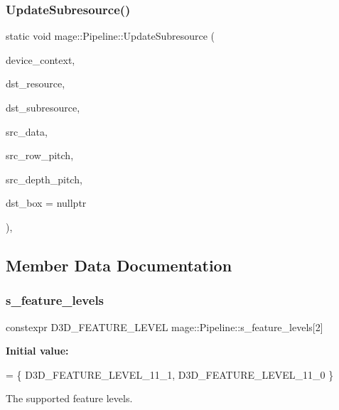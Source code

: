 \subsubsection{\texorpdfstring{Update\+Subresource()}{UpdateSubresource()}}
{\footnotesize\ttfamily static void mage\+::\+Pipeline\+::\+Update\+Subresource (\begin{DoxyParamCaption}\item[{I\+D3\+D11\+Device\+Context4 $\ast$}]{device\+\_\+context,  }\item[{I\+D3\+D11\+Resource $\ast$}]{dst\+\_\+resource,  }\item[{\hyperlink{namespacemage_a41c104c036fba3756a74e19f793eeaa1}{U32}}]{dst\+\_\+subresource,  }\item[{const void $\ast$}]{src\+\_\+data,  }\item[{\hyperlink{namespacemage_a41c104c036fba3756a74e19f793eeaa1}{U32}}]{src\+\_\+row\+\_\+pitch,  }\item[{\hyperlink{namespacemage_a41c104c036fba3756a74e19f793eeaa1}{U32}}]{src\+\_\+depth\+\_\+pitch,  }\item[{const D3\+D11\+\_\+\+B\+OX $\ast$}]{dst\+\_\+box = {\ttfamily nullptr} }\end{DoxyParamCaption})\hspace{0.3cm}{\ttfamily [static]}, {\ttfamily [noexcept]}}



\subsection{Member Data Documentation}
\hypertarget{structmage_1_1_pipeline_aa451423df031e728f3a3a35bfc942a9b}{}\label{structmage_1_1_pipeline_aa451423df031e728f3a3a35bfc942a9b} 
\subsubsection{\texorpdfstring{s\+\_\+feature\+\_\+levels}{s\_feature\_levels}}
{\footnotesize\ttfamily constexpr D3\+D\+\_\+\+F\+E\+A\+T\+U\+R\+E\+\_\+\+L\+E\+V\+EL mage\+::\+Pipeline\+::s\+\_\+feature\+\_\+levels\mbox{[}2\mbox{]}\hspace{0.3cm}{\ttfamily [static]}}

{\bfseries Initial value\+:}
\begin{DoxyCode}
= \{
            D3D\_FEATURE\_LEVEL\_11\_1,
            D3D\_FEATURE\_LEVEL\_11\_0
        \}
\end{DoxyCode}
The supported feature levels. 